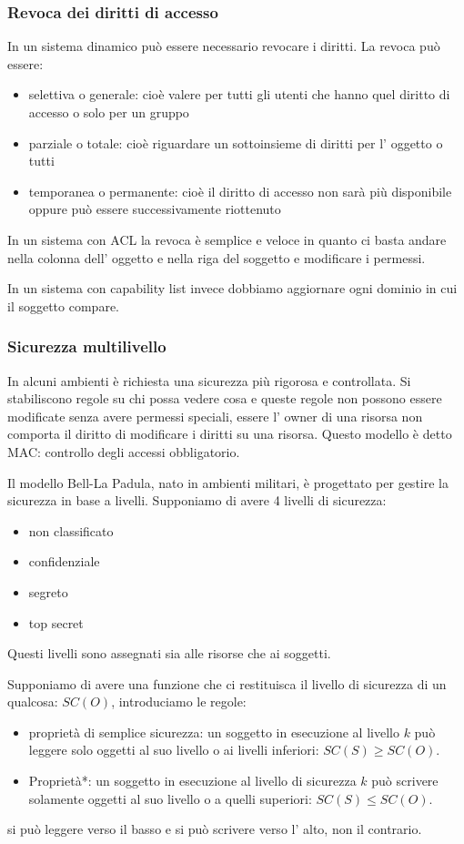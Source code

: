 \subsubsection{Revoca dei diritti di accesso}
In un sistema dinamico può essere necessario revocare i diritti.
La revoca può essere:
\begin{itemize}
    \item selettiva o generale: cioè valere per tutti gli utenti che hanno quel diritto di accesso o solo per un gruppo
    \item parziale o totale: cioè riguardare un sottoinsieme di diritti per l' oggetto o tutti
    \item temporanea o permanente: cioè il diritto di accesso non sarà più disponibile oppure può essere successivamente riottenuto 
\end{itemize}

In un sistema con ACL la revoca è semplice e veloce in quanto ci basta andare nella colonna dell' oggetto e nella riga del soggetto e modificare i permessi.

In un sistema con capability list invece dobbiamo aggiornare ogni dominio in cui il soggetto compare.

\subsubsection{Sicurezza multilivello}
In alcuni ambienti è richiesta una sicurezza più rigorosa e controllata.
Si stabiliscono regole su chi possa vedere cosa e queste regole non possono essere modificate senza avere permessi speciali, essere l' owner di una risorsa non comporta il diritto di modificare i diritti su una risorsa.
Questo modello è detto MAC: controllo degli accessi obbligatorio.

Il modello Bell-La Padula, nato in ambienti militari, è progettato per gestire la sicurezza in base a livelli.
Supponiamo di avere 4 livelli di sicurezza:
\begin{itemize}
    \item non classificato
    \item confidenziale
    \item segreto
    \item top secret
\end{itemize}
Questi livelli sono assegnati sia alle risorse che ai soggetti.

Supponiamo di avere una funzione che ci restituisca il livello di sicurezza di un qualcosa: $SC(O)$, introduciamo le regole:
\begin{itemize}
    \item proprietà di semplice sicurezza: un soggetto in esecuzione al livello $k$ può leggere solo oggetti al suo livello o ai livelli inferiori: $SC(S) \geq SC(O)$.
    
    \item Proprietà*: un soggetto in esecuzione al livello di sicurezza $k$ può scrivere solamente oggetti al suo livello o a quelli superiori: $SC(S) \leq SC(O)$.
\end{itemize}
si può leggere verso il basso e si può scrivere verso l' alto, non il contrario.

